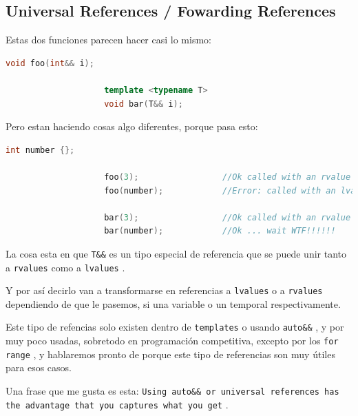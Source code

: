 \documentclass[12pt, fleqn]{report}                             %
\theoremstyle{break}                                            %
\newcommand{\textCode}[1]  { \texttt{#1} }                      %
\begin{document}
                \cite{rvalue2}

            \subsection{Universal References / Fowarding References} 
                
                Estas dos funciones parecen hacer casi lo mismo:
                \begin{lstlisting}[language=C++, gobble=20]
                    void foo(int&& i);
 
                    template <typename T>
                    void bar(T&& i);
                \end{lstlisting}

                Pero estan haciendo cosas algo diferentes, porque pasa esto:
                \begin{lstlisting}[language=C++, gobble=20]
                    int number {};

                    foo(3);                 //Ok called with an rvalue
                    foo(number);            //Error: called with an lvalue

                    bar(3);                 //Ok called with an rvalue
                    bar(number);            //Ok ... wait WTF!!!!!!
                \end{lstlisting}

                La cosa esta en que \textCode{T\&\&} es un tipo especial de referencia que se puede
                unir tanto a \textCode{rvalues} como a \textCode{lvalues}.

                Y por así decirlo van a transformarse en referencias a \textCode{lvalues} o a 
                \textCode{rvalues} dependiendo de que le pasemos, si una variable o un temporal respectivamente.
                
                Este tipo de refencias solo existen dentro de \textCode{templates} o usando
                \textCode{auto\&\&}, y por muy poco usadas, sobretodo en programación competitiva, excepto
                por los \textCode{for range}, y hablaremos pronto de porque este tipo de referencias son muy útiles
                para esos casos.

                Una frase que me gusta es esta: \textCode{Using auto\&\& or universal references 
                has the advantage that you captures what you get}.
                
\end{document}
